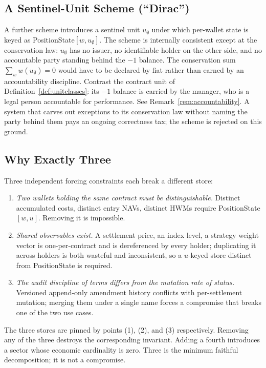 \documentclass[11pt,a4paper]{article}
\begin{document}
\subsection{A Sentinel-Unit Scheme (``Dirac'')}

A further scheme introduces a sentinel unit $u_\emptyset$ under which per-wallet state is keyed as PositionState$[w, u_\emptyset]$. The scheme is internally consistent except at the conservation law: $u_\emptyset$ has no issuer, no identifiable holder on the other side, and no accountable party standing behind the $-1$ balance. The conservation sum $\sum_w w(u_\emptyset) = 0$ would have to be declared by fiat rather than earned by an accountability discipline. Contrast the contract unit of Definition~\ref{def:unitclasses}: its $-1$ balance is carried by the manager, who is a legal person accountable for performance. See Remark~\ref{rem:accountability}. A system that carves out exceptions to its conservation law without naming the party behind them pays an ongoing correctness tax; the scheme is rejected on this ground.

\subsection{Why Exactly Three}

Three independent forcing constraints each break a different store:
\begin{enumerate}[leftmargin=*]
\item \emph{Two wallets holding the same contract must be distinguishable.} Distinct accumulated costs, distinct entry NAVs, distinct HWMs require PositionState$[w, u]$. Removing it is impossible.
\item \emph{Shared observables exist.} A settlement price, an index level, a strategy weight vector is one-per-contract and is dereferenced by every holder; duplicating it across holders is both wasteful and inconsistent, so a $u$-keyed store distinct from PositionState is required.
\item \emph{The audit discipline of terms differs from the mutation rate of status.} Versioned append-only amendment history conflicts with per-settlement mutation; merging them under a single name forces a compromise that breaks one of the two use cases.
\end{enumerate}

\noindent The three stores are pinned by points (1), (2), and (3) respectively. Removing any of the three destroys the corresponding invariant. Adding a fourth introduces a sector whose economic cardinality is zero. Three is the minimum faithful decomposition; it is not a compromise.
\end{document}
